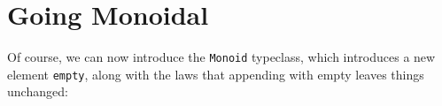 \documentclass[]{article}
\newenvironment{Shaded}{}{}
\newcommand{\DataTypeTok}[1]{\textcolor[rgb]{0.56,0.13,0.00}{#1}}
\newcommand{\FunctionTok}[1]{\textcolor[rgb]{0.02,0.16,0.49}{#1}}
\newcommand{\NormalTok}[1]{#1}
\newcommand{\OperatorTok}[1]{\textcolor[rgb]{0.40,0.40,0.40}{#1}}
\begin{document}
\begin{Shaded}
\end{Shaded}

\section{Going Monoidal}\label{going-monoidal}

Of course, we can now introduce the \texttt{Monoid} typeclass, which introduces
a new element \texttt{empty}, along with the laws that appending with empty
leaves things unchanged:
\end{document}

